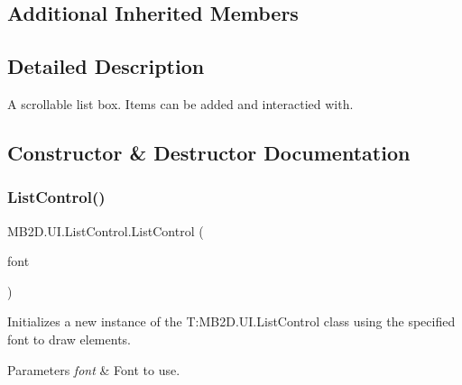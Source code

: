\subsection*{Additional Inherited Members}


\subsection{Detailed Description}
A scrollable list box. Items can be added and interactied with. 



\subsection{Constructor \& Destructor Documentation}
\hypertarget{class_m_b2_d_1_1_u_i_1_1_list_control_a7248e2ea186e805d76e9c6c84986f85c}{}\label{class_m_b2_d_1_1_u_i_1_1_list_control_a7248e2ea186e805d76e9c6c84986f85c} 
\subsubsection{\texorpdfstring{List\+Control()}{ListControl()}\hspace{0.1cm}{\footnotesize\ttfamily [1/2]}}
{\footnotesize\ttfamily M\+B2\+D.\+U\+I.\+List\+Control.\+List\+Control (\begin{DoxyParamCaption}\item[{Sprite\+Font}]{font }\end{DoxyParamCaption})\hspace{0.3cm}{\ttfamily [inline]}}



Initializes a new instance of the T\+:\+M\+B2\+D.\+U\+I.\+List\+Control class using the specified font to draw elements. 


\begin{DoxyParams}{Parameters}
{\em font} & Font to use.\\
\hline
\end{DoxyParams}
\hypertarget{class_m_b2_d_1_1_u_i_1_1_list_control_af89e91c17451a74cb0edbada9a1c0d17}{}\label{class_m_b2_d_1_1_u_i_1_1_list_control_af89e91c17451a74cb0edbada9a1c0d17} 
